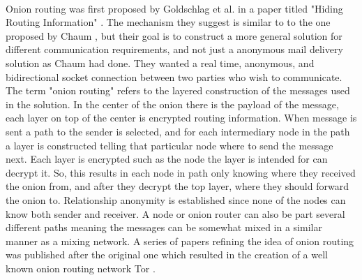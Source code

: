 \documentclass[informationsecurity]{gucmasterproject}
\begin{document}
\paragraph{}
Onion routing was first proposed by Goldschlag et al. in a paper titled "Hiding Routing Information" \cite{goldschlag1996hiding}.
The mechanism they suggest is similar to to the one proposed by Chaum \cite{chaum1981untraceable}, but their goal is to construct a more general solution for different communication requirements, and not just a anonymous mail delivery solution as Chaum had done. They wanted a real time, anonymous, and bidirectional socket connection between two parties who wish to communicate. The term "onion routing" refers to the layered construction of the messages used in the solution. In the center of the onion there is the payload of the message, each layer on top of the center is encrypted routing information. When message is sent a path to the sender is selected, and for each intermediary node in the path a layer is constructed telling that particular node where to send the message next. Each layer is encrypted such as the node the layer is intended for can decrypt it. So, this results in each node in path only knowing where they received the onion from, and after they decrypt the top layer, where they should forward the onion to. Relationship anonymity is established since none of the nodes can know both sender and receiver. A node or onion router can also be part several different paths meaning the messages can be somewhat mixed in a similar manner as a mixing network.
A series of papers refining the idea of onion routing was published after the original one which resulted in the creation of a well known onion routing network Tor \cite{reed1998anonymous}\cite{goldschlag1999onion}\cite{dingledine2004tor}.
\end{document}
